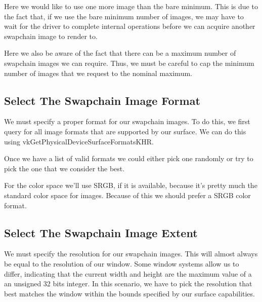 Here we would like to use one more image than the bare minimum.
This is due to the fact that, if we use the bare minimum number of images,
we may have to wait for the driver to complete internal operations before
we can acquire another swapchain image to render to.

Here we also be aware of the fact that there can be a maximum number of
swapchain images we can require.
Thus, we must be careful to cap the minimum number of images that
we request to the nominal maximum.

\subsection{Select The Swapchain Image Format}

We must specify a proper format for our swapchain images.
To do this, we first query for all image formats that are supported by our
surface.
We can do this using vkGetPhysicalDeviceSurfaceFormatsKHR.

Once we have a list of valid formats we could either pick one randomly or
try to pick the one that we consider the best.

\begin{minipage}{\linewidth}{\noindent}
    
\end{minipage}

For the color space we'll use SRGB, if it is available, because it's pretty much
the standard color space for images.
Because of this we should prefer a SRGB color format.

\subsection{Select The Swapchain Image Extent}

We must specify the resolution for our swapchain images.
This will almost always be equal to the resolution of our window.
Some window systems allow us to differ, indicating that the current
width and height are the maximum value of a an unsigned 32 bits integer.
In this scenario, we have to pick the resolution that best matches the window
within the bounds specified by our surface capabilities.

\begin{minipage}{\linewidth}{\noindent}
    
\end{minipage}


